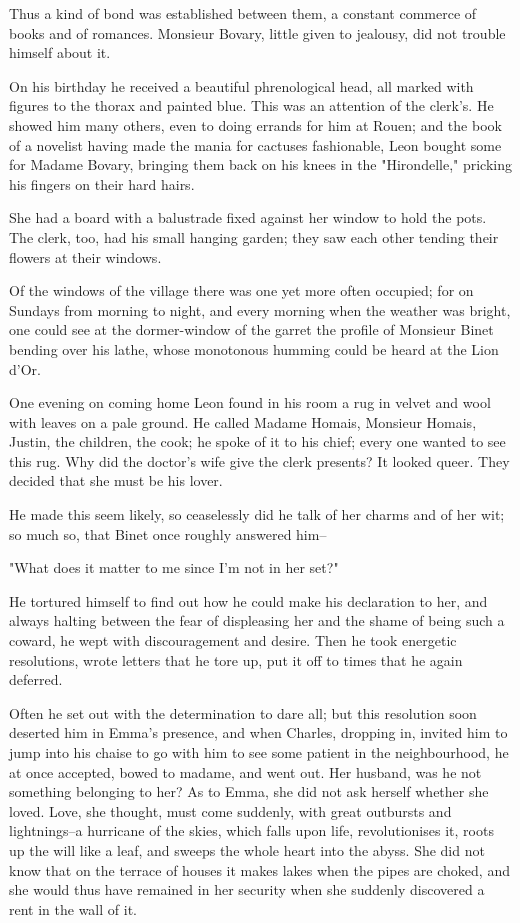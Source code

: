 \documentclass{tufte-book}
\begin{document}
Thus a kind of bond was established between them, a constant commerce
of books and of romances. Monsieur Bovary, little given to jealousy, did
not trouble himself about it.

On his birthday he received a beautiful phrenological head, all marked
with figures to the thorax and painted blue. This was an attention of
the clerk's. He showed him many others, even to doing errands for him
at Rouen; and the book of a novelist having made the mania for cactuses
fashionable, Leon bought some for Madame Bovary, bringing them back on
his knees in the "Hirondelle," pricking his fingers on their hard hairs.

She had a board with a balustrade fixed against her window to hold the
pots. The clerk, too, had his small hanging garden; they saw each other
tending their flowers at their windows.

Of the windows of the village there was one yet more often occupied; for
on Sundays from morning to night, and every morning when the weather was
bright, one could see at the dormer-window of the garret the profile of
Monsieur Binet bending over his lathe, whose monotonous humming could be
heard at the Lion d'Or.

One evening on coming home Leon found in his room a rug in velvet and
wool with leaves on a pale ground. He called Madame Homais, Monsieur
Homais, Justin, the children, the cook; he spoke of it to his chief;
every one wanted to see this rug. Why did the doctor's wife give the
clerk presents? It looked queer. They decided that she must be his
lover.

He made this seem likely, so ceaselessly did he talk of her charms and
of her wit; so much so, that Binet once roughly answered him--

"What does it matter to me since I'm not in her set?"

He tortured himself to find out how he could make his declaration to
her, and always halting between the fear of displeasing her and the
shame of being such a coward, he wept with discouragement and desire.
Then he took energetic resolutions, wrote letters that he tore up, put
it off to times that he again deferred.

Often he set out with the determination to dare all; but this resolution
soon deserted him in Emma's presence, and when Charles, dropping in,
invited him to jump into his chaise to go with him to see some patient
in the neighbourhood, he at once accepted, bowed to madame, and went
out. Her husband, was he not something belonging to her? As to Emma,
she did not ask herself whether she loved. Love, she thought, must come
suddenly, with great outbursts and lightnings--a hurricane of the skies,
which falls upon life, revolutionises it, roots up the will like a leaf,
and sweeps the whole heart into the abyss. She did not know that on
the terrace of houses it makes lakes when the pipes are choked, and she
would thus have remained in her security when she suddenly discovered a
rent in the wall of it.
\end{document}
